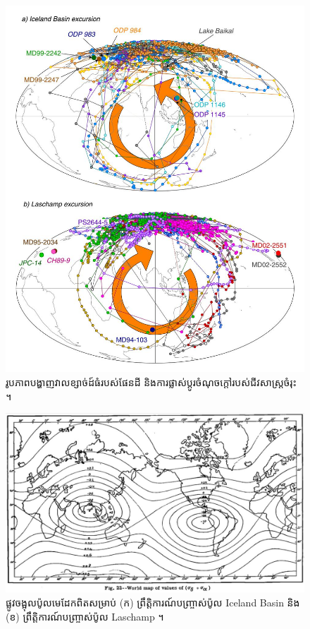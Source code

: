 \documentclass[10pt,twocolumn,letterpaper]{article}
\begin{document}
\begin{figure}[t]
\begin{center}
   \includegraphics[width=0.95\linewidth]{laj.jpg}
\end{center}
   \caption{រូបភាពបង្ហាញវាលខ្សាច់ដ៍ធំរបស់ផែនដី និង​ការផ្លាស់ប្តូរចំណុចក្តៅរបស់ជីវសាស្ត្រចំរុះ \cite{35}។}
\label{fig:7}
\label{fig:onecol}
\end{figure}

\begin{figure}[t]
\begin{center}
   \includegraphics[width=1\linewidth]{meinesz3.jpg}
\end{center}
   \caption{ផ្លូវចង្អុលប៉ូលមេដែកពិតសម្រាប់ (ក) ព្រឹត្តិការណ៍បញ្ច្រាស់ប៉ូល Iceland Basin និង (ខ) ព្រឹត្តិការណ៍បញ្ច្រាស់ប៉ូល Laschamp  \cite{36}។}
\label{fig:8}

\label{fig:onecol}
\end{figure}
\end{document}
